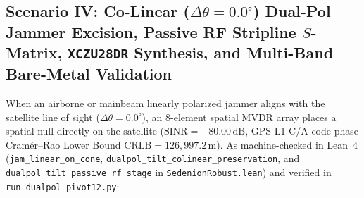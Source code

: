 \documentclass[11pt,a4paper]{article}
\theoremstyle{definition}
\theoremstyle{remark}
\begin{document}
\subsection{Scenario IV: Co-Linear ($\Delta\theta = 0.0^\circ$) Dual-Pol Jammer Excision, Passive RF Stripline $S$-Matrix, \texttt{XCZU28DR} Synthesis, and Multi-Band Bare-Metal Validation}
\label{sec:dualpol_hw}
\sloppy

When an airborne or mainbeam linearly polarized jammer aligns with the satellite line of sight ($\Delta\theta = 0.0^\circ$), an 8-element spatial MVDR array places a spatial null directly on the satellite ($\mathrm{SINR} = -80.00\,\mathrm{dB}$, GPS L1 C/A code-phase Cram\'er--Rao Lower Bound $\mathrm{CRLB} = 126{,}997.2\,\mathrm{m}$). As machine-checked in Lean~4 (\texttt{jam\_linear\_on\_cone}, \texttt{dualpol\_tilt\_colinear\_preservation}, and \texttt{dualpol\_tilt\_passive\_rf\_stage} in \texttt{SedenionRobust.lean}) and verified in \texttt{run\_dualpol\_pivot12.py}:
\end{document}
